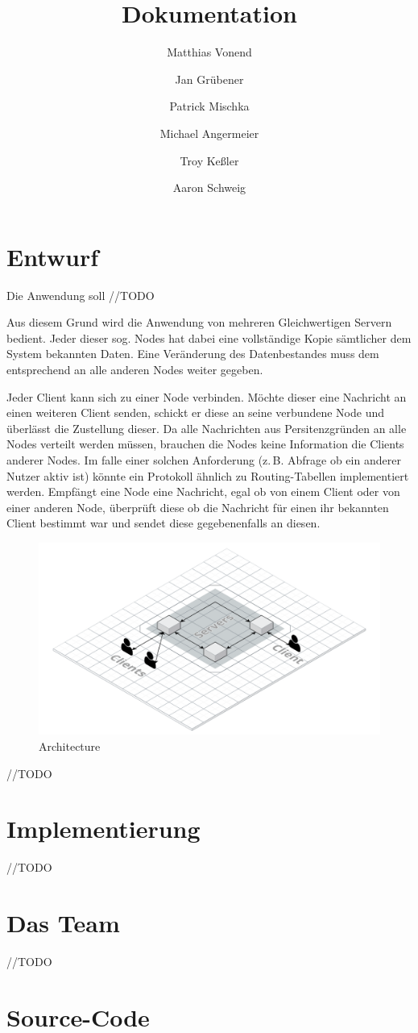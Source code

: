 \documentclass[a4paper]{article}
\title{Dokumentation}
\author{
    Matthias Vonend
    \and
    Jan Grübener
    \and
    Patrick Mischka
    \and
    Michael Angermeier
    \and
    Troy Keßler
    \and
    Aaron Schweig
    \and
}
\theoremstyle{definition}
\begin{document}
    \maketitle

   

    \section{Entwurf}
    Die Anwendung soll //TODO

    Aus diesem Grund wird die Anwendung von mehreren Gleichwertigen Servern bedient. Jeder dieser sog. Nodes hat dabei eine vollständige Kopie sämtlicher dem System bekannten Daten. Eine Veränderung des Datenbestandes muss dem entsprechend an alle anderen Nodes weiter gegeben.

    Jeder Client kann sich zu einer Node verbinden. Möchte dieser eine Nachricht an einen weiteren Client senden, schickt er diese an seine verbundene Node und überlässt die Zustellung dieser. Da alle Nachrichten aus Persitenzgründen an alle Nodes verteilt werden müssen, brauchen die Nodes keine Information die Clients anderer Nodes. Im falle einer solchen Anforderung (z.\,B. Abfrage ob ein anderer Nutzer aktiv ist) könnte ein Protokoll ähnlich zu Routing-Tabellen implementiert werden. Empfängt eine Node eine Nachricht, egal ob von einem Client oder von einer anderen Node, überprüft diese ob die Nachricht für einen ihr bekannten Client bestimmt war und sendet diese gegebenenfalls an diesen.

    \begin{figure}[h]
        \centering
        \includegraphics[width=\textwidth]{architecture.png}
        
        \caption{Architecture}
        \label{}
    \end{figure}

    //TODO

    \section{Implementierung}
    //TODO

    \section{Das Team}
    //TODO

    \clearpage
    \section{Source-Code}
    
\end{document}
